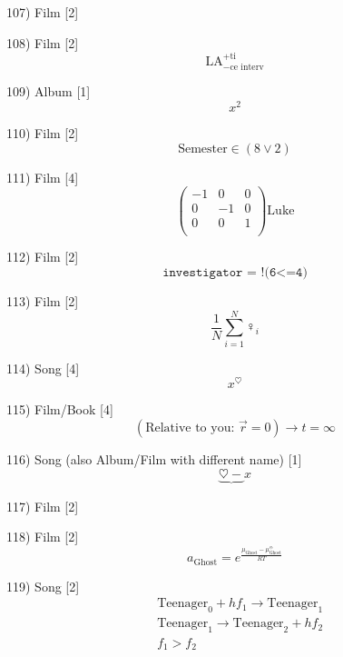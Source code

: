 \documentclass[10pt]{article}
\begin{document}
    107) Film [2]
    \begin{figure}
    \end{figure}

    108) Film [2]
    \[
      \text{LA}^{+ \text{ti}}_{-\text{ce interv}}
    \]

    109) Album [1]
    \[
      x^2
    \]
    
    110) Film [2]
    \[
      \text{Semester} \in (8  \lor 2)
    \]

    111) Film [4]
    \[
        \begin{pmatrix}
          -1 & 0 & 0 \\
          0 & -1 & 0 \\
          0 & 0  & 1 \\
        \end{pmatrix}
        \text{Luke} 
    \]

    112) Film [2]
    \[
      \texttt{investigator = !(6<=4)}
    \]

    113) Film [2]
    \[
        \frac{1}{N} \sum_{i=1}^{N}\female_i
\]

    114) Song [4]
    \[
      x^\heartsuit
    \]

    115) Film/Book [4]
    \[
      (\text{Relative to you: } \vec{r}=0 ) \to t = \infty
    \]

    116) Song (also Album/Film with different name) [1]
    \[
        \underbrace{\heartsuit -} x   
    \]

    117) Film [2]
    \begin{figure}
    \end{figure}

    118) Film [2]
    \[
      a_\text{Ghost} = e^{\frac{\mu_\text{Ghost} - \mu_\text{Ghost}^\ominus}{RT}}
    \]

    119) Song [2]
    \[
    \begin{split}
      &\text{Teenager}_0 + h f_1 \to \text{Teenager}_1 \\
      &\text{Teenager}_1 \to \text{Teenager}_2 + h f_2 \\
      &f_1 > f_2 \\
    \end{split}
    \]
\end{document}
